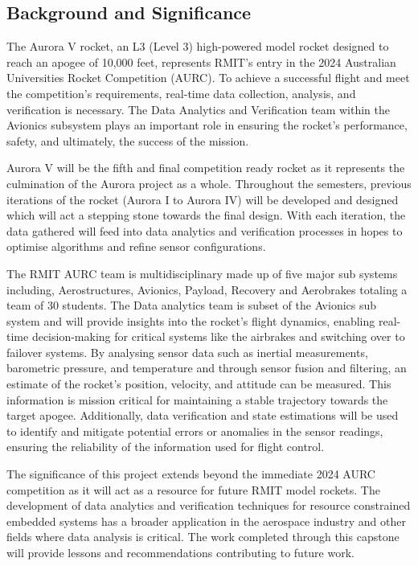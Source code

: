 \subsection{Background and Significance}
The Aurora V rocket, an L3 (Level 3) high-powered model rocket designed to reach an apogee of 10,000 feet, represents RMIT's entry in the 2024 Australian Universities Rocket Competition (AURC). To achieve a successful flight and meet the competition's requirements, real-time data collection, analysis, and verification is necessary. The Data Analytics and Verification team within the Avionics subsystem plays an important role in ensuring the rocket's performance, safety, and ultimately, the success of the mission. 

Aurora V will be the fifth and final competition ready rocket as it represents the culmination of the Aurora project as a whole. Throughout the semesters, previous iterations of the rocket (Aurora I to Aurora IV) will be developed and designed which will act a stepping stone towards the final design. With each iteration, the data gathered will feed into data analytics and verification processes in hopes to optimise algorithms and refine sensor configurations.  

The RMIT AURC team is multidisciplinary made up of five major sub systems including, Aerostructures, Avionics, Payload, Recovery and Aerobrakes totaling a team of 30 students. The Data analytics team is subset of the Avionics sub system and will provide insights into the rocket's flight dynamics, enabling real-time decision-making for critical systems like the airbrakes and switching over to failover systems. By analysing sensor data such as inertial measurements, barometric pressure, and temperature and through sensor fusion and filtering, an estimate of the rocket's position, velocity, and attitude can be measured. This information is mission critical for maintaining a stable trajectory towards the target apogee. Additionally, data verification and state estimations will be used to identify and mitigate potential errors or anomalies in the sensor readings, ensuring the reliability of the information used for flight control. 

The significance of this project extends beyond the immediate 2024 AURC competition as it will act as a resource for future RMIT model rockets. The development of data analytics and verification techniques for resource constrained embedded systems has a broader application in the aerospace industry and other fields where data analysis is critical. The work completed through this capstone will provide lessons and recommendations contributing to future work.  

